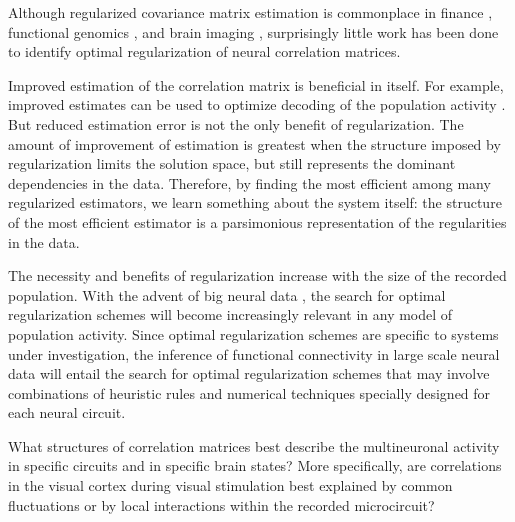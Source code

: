 \documentclass[10pt]{article}
\begin{document}
Although regularized covariance matrix estimation is commonplace in finance \cite{Ledoit:2003}, functional genomics \cite{Schafer:2005}, and brain imaging \cite{Ryali:2012}, surprisingly little work has been done to identify optimal regularization of neural correlation matrices. 

Improved estimation of the correlation matrix is beneficial in itself. For example, improved estimates can be used to optimize  decoding of the population activity \cite{Friedman:1989}. But reduced estimation error is not the only benefit of regularization.  The amount of improvement of estimation is greatest when the structure imposed by regularization limits the solution space, but still represents the dominant dependencies in the data. Therefore, by finding the most efficient among many regularized estimators, we learn something about the system itself: the structure of the most efficient estimator is a parsimonious representation of the regularities in the data. 

The necessity and benefits of regularization increase with the size of the recorded population. With the advent of  big neural data \cite{Alivisatos:2013}, the search for optimal regularization schemes will become increasingly relevant in any model of population activity. Since optimal regularization schemes are specific to systems under investigation, the inference of functional connectivity in large scale neural data will entail the search for optimal regularization schemes that may involve combinations of heuristic rules and numerical techniques specially designed for each neural circuit.

What structures of correlation matrices best describe the multineuronal activity in specific circuits and in specific brain states?  More specifically, are correlations in the visual cortex during visual stimulation best explained by common fluctuations or by local interactions within the recorded microcircuit? 
\end{document}

